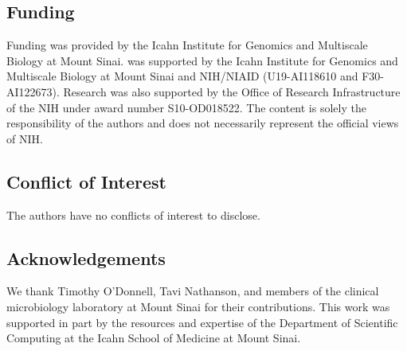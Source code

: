 \subsection*{Funding}

Funding was provided by the Icahn Institute for Genomics and Multiscale Biology at Mount Sinai.  was supported by the Icahn Institute for Genomics and Multiscale Biology at Mount Sinai and NIH/NIAID (U19-AI118610 and F30-AI122673). Research was also supported by the Office of Research Infrastructure of the NIH under award number S10-OD018522. The content is solely the responsibility of the authors and does not necessarily represent the official views of NIH.

\subsection*{Conflict of Interest}

The authors have no conflicts of interest to disclose.

\subsection*{Acknowledgements}

We thank Timothy O’Donnell, Tavi Nathanson, and members of the clinical microbiology laboratory at Mount Sinai for their contributions. This work was supported in part by the resources and expertise of the Department of Scientific Computing at the Icahn School of Medicine at Mount Sinai.
